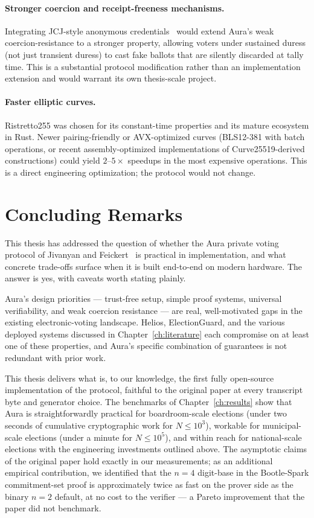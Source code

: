 \documentclass[12pt,a4paper,oneside]{report}
\begin{document}
\paragraph{Stronger coercion and receipt-freeness mechanisms.} 
Integrating JCJ-style anonymous credentials~\cite{jcj} would extend 
Aura's weak coercion-resistance to a stronger property, allowing 
voters under sustained duress (not just transient duress) to cast 
fake ballots that are silently discarded at tally time. This is a 
substantial protocol modification rather than an implementation 
extension and would warrant its own thesis-scale project.

\paragraph{Faster elliptic curves.} 
Ristretto255 was chosen for its constant-time properties and its 
mature ecosystem in Rust. Newer pairing-friendly or AVX-optimized 
curves (BLS12-381 with batch operations, or recent assembly-optimized 
implementations of Curve25519-derived constructions) could yield 
$2$--$5\times$ speedups in the most expensive operations. This is 
a direct engineering optimization; the protocol would not change.

\section{Concluding Remarks}
\label{sec:concluding-remarks}

This thesis has addressed the question of whether the Aura private 
voting protocol of Jivanyan and Feickert~\cite{aura2022} is practical 
in implementation, and what concrete trade-offs surface when it is 
built end-to-end on modern hardware. The answer is yes, with caveats 
worth stating plainly.

Aura's design priorities --- trust-free setup, simple proof systems, 
universal verifiability, and weak coercion resistance --- are real, 
well-motivated gaps in the existing electronic-voting landscape. 
Helios, ElectionGuard, and the various deployed systems discussed in 
Chapter~\ref{ch:literature} each compromise on at least one of these 
properties, and Aura's specific combination of guarantees is not 
redundant with prior work.

This thesis delivers what is, to our knowledge, the first fully 
open-source implementation of the protocol, faithful to the original 
paper at every transcript byte and generator choice. The benchmarks 
of Chapter~\ref{ch:results} show that Aura is straightforwardly 
practical for boardroom-scale elections (under two seconds of 
cumulative cryptographic work for $N \le 10^3$), workable for 
municipal-scale elections (under a minute for $N \le 10^5$), and 
within reach for national-scale elections with the engineering 
investments outlined above. The asymptotic claims of the original 
paper hold exactly in our measurements; as an additional empirical 
contribution, we identified that the $n = 4$ digit-base in the 
Bootle-Spark commitment-set proof is approximately twice as fast on 
the prover side as the binary $n = 2$ default, at no cost to the 
verifier --- a Pareto improvement that the paper did not benchmark.
\end{document}

